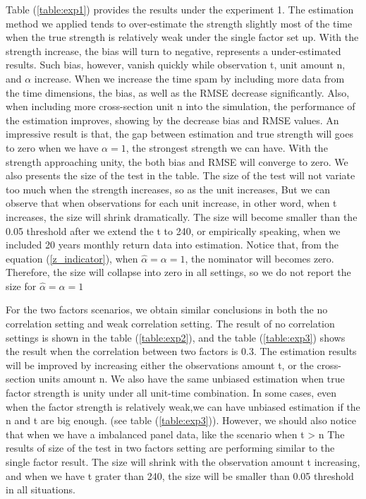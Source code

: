 Table (\ref{table:exp1}) provides the results under the experiment 1.
The estimation method we applied tends to over-estimate the strength slightly most of the time when the true strength is relatively weak under the single factor set up.
With the strength increase, the bias will turn to negative, represents a under-estimated results.
Such bias, however, vanish quickly while observation t, unit amount n, and  $\alpha$ increase.
When we increase the time spam by including more data from the time dimensions, the bias, as well as the RMSE decrease significantly.
Also, when including more cross-section unit n into the simulation, the performance of the estimation improves, showing by the decrease bias and RMSE values.
An impressive result is that, the gap between estimation and true strength will goes to zero when we have $\alpha = 1$, the strongest strength we can have.
With the strength approaching unity, the both bias and RMSE will converge to zero.
We also presents the size of the test in the table.
The size of the test will not variate too much when the strength increases, so as the unit increases,
But we can observe that when observations for each unit increase, in other word, when t increases, the size will shrink dramatically.
The size will become smaller than the 0.05 threshold after we extend the t to 240, or empirically  speaking, when we included 20 years monthly return data into estimation.
Notice that, from the equation (\ref{z_indicator}), when $\hat{\alpha} = \alpha = 1$, the nominator will becomes zero.
Therefore, the size will collapse into zero in all settings, so we do not report the size for $\hat{\alpha} = \alpha = 1$

For the two factors scenarios, we obtain similar conclusions in both the no correlation setting and weak correlation setting.
The result of no correlation settings is shown in the table (\ref{table:exp2}), and the table (\ref{table:exp3}) shows the result when the correlation between two factors is 0.3.
The estimation results will be improved by increasing either the observations amount t, or the cross-section units amount n.
We also have the same unbiased estimation when true factor strength is unity under all unit-time combination.
In some cases, even when the factor strength is relatively weak,we can have unbiased estimation if the n and t are big enough. (see table (\ref{table:exp3})).
However, we should also notice that when we have a imbalanced panel data, like the scenario when t > n
The results of size of the test in two factors setting are performing similar to the single factor result. 
The size will shrink with the observation amount t increasing, and when we have t grater than 240, the size will be smaller than 0.05 threshold in all situations.

